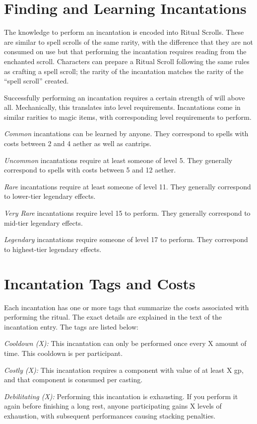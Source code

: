 \section{Finding and Learning Incantations}
The knowledge to perform an incantation is encoded into Ritual Scrolls. These are similar to spell scrolls of the same rarity, with the difference that they are not consumed on use but that performing the incantation requires reading from the enchanted scroll. Characters can prepare a Ritual Scroll following the same rules as crafting a spell scroll; the rarity of the incantation matches the rarity of the “spell scroll” created. 

Successfully performing an incantation requires a certain strength of will above all. Mechanically, this translates into level requirements. Incantations come in similar rarities to magic items, with corresponding level requirements to perform.

\textit{Common} incantations can be learned by anyone. They correspond to spells with costs between 2 and 4 aether as well as cantrips.

\textit{Uncommon} incantations require at least someone of level 5. They generally correspond to spells with costs between 5 and 12 aether.

\textit{Rare} incantations require at least someone of level 11. They generally correspond to lower-tier legendary effects.

\textit{Very Rare} incantations require level 15 to perform. They generally correspond to mid-tier legendary effects.

\textit{Legendary} incantations require someone of level 17 to perform. They correspond to highest-tier legendary effects.

\section{Incantation Tags and Costs}
Each incantation has one or more tags that summarize the costs associated with performing the ritual. The exact details are explained in the text of the incantation entry. The tags are listed below:

\textit{Cooldown (X):} This incantation can only be performed once every X amount of time. This cooldown is per participant.

\textit{Costly (X):} This incantation requires a component with value of at least X gp, and that component is consumed per casting.

\textit{Debilitating (X):} Performing this incantation is exhausting. If you perform it again before finishing a long rest, anyone participating gains X levels of exhaustion, with subsequent performances causing stacking penalties.

